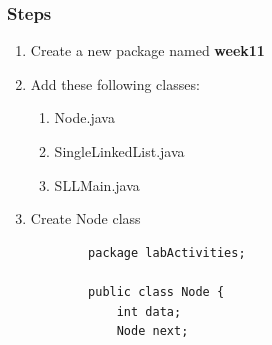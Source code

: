 \documentclass[12pt,titlepage]{article}
\begin{document}
\subsubsection{Steps}
\begin{enumerate}
    \item Create a new package named \textbf{week11}
    \item Add these following classes:

    \begin{enumerate}
        \item Node.java
        \item SingleLinkedList.java
        \item SLLMain.java
    \end{enumerate}

    \item Create Node class
    \begin{verbatim}
        package labActivities;

        public class Node {
            int data;
            Node next;


\end{verbatim}
\end{enumerate}
\end{document}
